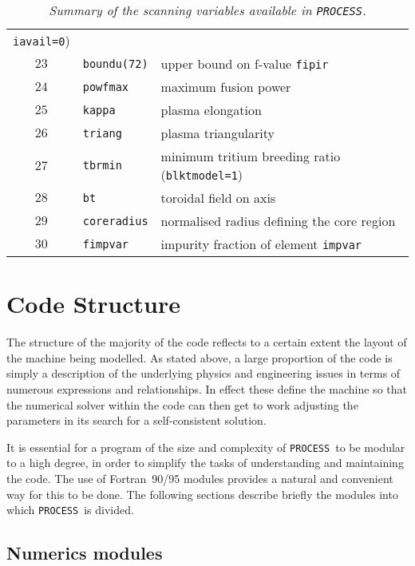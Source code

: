\documentclass[11pt,a4paper]{report}
\newcommand{\process}{\mbox{\texttt{PROCESS}}}
\begin{document}
\begin{table}[tbph]
\begin{center}
\begin{tabular}{||c|l|l||}
\texttt{iavail=0}) \\
$23$ & \texttt{boundu(72)} & upper bound on f-value \texttt{fipir} \\
$24$ & \texttt{powfmax}    & maximum fusion power \\
$25$ & \texttt{kappa}      & plasma elongation \\
$26$ & \texttt{triang}     & plasma triangularity \\
$27$ & \texttt{tbrmin}     & minimum tritium breeding ratio (\texttt{blktmodel=1}) \\
$28$ & \texttt{bt}         & toroidal field on axis \\
$29$ & \texttt{coreradius} & normalised radius defining the core region \\
$30$ & \texttt{fimpvar}    & impurity fraction of element \texttt{impvar} \\
\hline
\end{tabular}
\end{center}
\caption[List of scanning variables]
{\label{tab:scans}
  \textit{Summary of the scanning variables available in \process.}
}
\end{table}

\section{Code Structure}

The structure of the majority of the code reflects to a certain extent the
layout of the machine being modelled. As stated above, a large proportion of
the code is simply a description of the underlying physics and engineering
issues in terms of numerous expressions and relationships. In effect these
define the machine so that the numerical solver within the code can then get
to work adjusting the parameters in its search for a self-consistent solution.

It is essential for a program of the size and complexity of \process\ to be
modular to a high degree, in order to simplify the tasks of understanding and
maintaining the code. The use of Fortran~90/95 modules provides a natural and
convenient way for this to be done. The following sections describe briefly
the modules into which \process\ is divided.

\subsection{Numerics modules}
\label{sec:numerics_modules}
\end{document}
